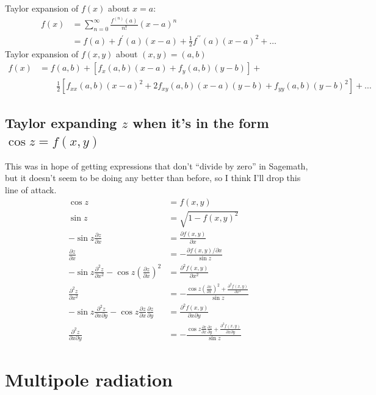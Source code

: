 \documentclass{book}
\newcommand{\pd}[2]{\frac{\partial {#1}}{\partial {#2}}}
\newcommand{\ppd}[2]{\frac{\partial^2{#1}}{\partial {#2}^2}}
\newcommand{\pdpd}[3]{\frac{\partial^2{#1}}{\partial {#2} \partial {#3}}}
\begin{document}
Taylor expansion of $f(x)$ about $x = a$:
\begin{equation}
    \begin{aligned}
        f(x) &= \sum_{n=0}^\infty \frac{f^{(n)}(a)}{n!}(x-a)^n \\
             &= f(a) + f^\prime(a)(x-a) + \frac12 f^{\prime\prime}(a)(x-a)^2 + \dots
    \end{aligned}
\end{equation}
Taylor expansion of $f(x,y)$ about $(x,y) = (a,b)$
\begin{equation}
    \begin{aligned}
        f(x) &= f(a,b) + [f_x(a,b)(x-a) + f_y(a,b)(y-b)] + \\
             &\qquad \frac12 [f_{xx}(a,b)(x-a)^2 + 2f_{xy}(a,b)(x-a)(y-b) + f_{yy}(a,b)(y-b)^2] + \dots
    \end{aligned}
\end{equation}

\subsection{Taylor expanding $z$ when it's in the form $\cos z = f(x,y)$}

This was in hope of getting expressions that don't ``divide by zero'' in Sagemath, but it doesn't seem to be doing any better than before, so I think I'll drop this line of attack.
\begin{equation}
    \begin{aligned}
        \cos z &= f(x,y) \\
        \sin z &= \sqrt{1-f(x,y)^2} \\
        -\sin z \pd{z}{x} &= \pd{f(x,y)}{x} \\
        \pd{z}{x} &= -\frac{\partial f(x,y)/\partial{x}}{\sin z} \\
        -\sin z \ppd{z}{x} - \cos z \left(\pd{z}{x}\right)^2 &= \ppd{f(x,y)}{x} \\
        \ppd{z}{x} &= -\frac{\cos z \left(\pd{z}{x}\right)^2 + \ppd{f(x,y)}{x}}{\sin z} \\
        -\sin z \pdpd{z}{x}{y} - \cos z \pd{z}{x}\pd{z}{y} &= \pdpd{f(x,y)}{x}{y} \\
        \pdpd{z}{x}{y} &= -\frac{\cos z \pd{z}{x}\pd{z}{y} + \pdpd{f(x,y)}{x}{y}}{\sin z}
    \end{aligned}
\end{equation}

\section{Multipole radiation}
\end{document}
